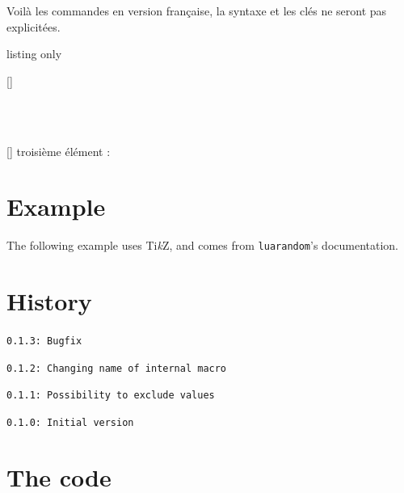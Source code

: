 \documentclass[11pt,a4paper]{ltxdoc}
\providecommand\tikzlogo{Ti\textit{k}Z}
\let\TikZ\tikzlogo
\begin{document}
Voilà les commandes en version française, la syntaxe et les clés ne seront pas explicitées.

\begin{DemoCode}{listing only}
\ListeRandint[Min=..,Max=..,Nb=..,Repet=..,Graine=..,Tri=..,Sep=..,Exclure=..]{\macro}

[\macrores]
\end{DemoCode}

\begin{DemoCode}{}
\ListeRandint[Min=5,Max=15,Nb=7,Repet,Tri=croiss,Sep={/}]{\maliste}\maliste\\
\end{DemoCode}

\begin{DemoCode}{}
\ListeRandint[Min=50,Max=100,Nb=10,Repet,Tri=croiss]{\malisteB}\malisteB\\
[\montroisieme]%
troisième élément : \montroisieme
\end{DemoCode}

\pagebreak

\section{Example}

The following example uses \TikZ, and comes from \texttt{luarandom}'s documentation.

\begin{DemoCode}{}
\end{DemoCode}

\pagebreak

\section{History}

\texttt{0.1.3: Bugfix}

\texttt{0.1.2: Changing name of internal macro}

\texttt{0.1.1: Possibility to exclude values}

\texttt{0.1.0: Initial version}

\section{The code}

\end{document}
